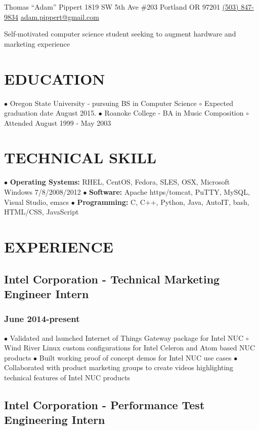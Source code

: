\documentclass{article}
\begin{document}
Thomas ``Adam'' Pippert
1819 SW 5th Ave \#203
Portland OR 97201
\href{tel:+15038479834}{(503) 847-9834}
\href{mailto:adam.pippert@gmail.com}{adam.pippert@gmail.com}

Self-motivated computer science student seeking to augment hardware and marketing experience

\section*{EDUCATION}

$\bullet$ Oregon State University - pursuing BS in Computer Science
$  \circ$ Expected graduation date August 2015.
$\bullet$ Roanoke College - BA in Music Composition
$  \circ$ Attended August 1999 - May 2003

\section*{TECHNICAL SKILL}

$\bullet$ \textbf{Operating Systems:} RHEL, CentOS, Fedora, SLES, OSX, Microsoft Windows 7/8/2008/2012
$\bullet$ \textbf{Software:} Apache https/tomcat, PuTTY, MySQL, Visual Studio, emacs
$\bullet$ \textbf{Programming:} C, C++, Python, Java, AutoIT, bash, HTML/CSS, JavaScript

\section*{EXPERIENCE}

\subsection*{Intel Corporation - Technical Marketing Engineer Intern}
\subsubsection*{June 2014-present}

$\bullet$ Validated and launched Internet of Things Gateway package for Intel NUC
$  \circ$ Wind River Linux custom configurations for Intel Celeron and Atom based NUC products
$\bullet$ Built working proof of concept demos for Intel NUC use cases 
$\bullet$ Collaborated with product marketing groups to create videos highlighting technical features of Intel NUC products


\subsection*{Intel Corporation - Performance Test Engineering Intern}
\end{document}

